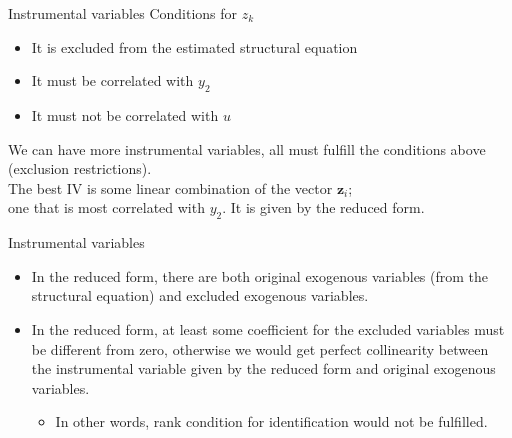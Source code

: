 \documentclass[usenames,dvipsnames]{beamer}
\begin{document}
\begin{frame}{Instrumental variables}
Conditions for $z_k$
\vspace{0.3cm}
\begin{itemize}
\item It is excluded from the estimated structural equation
\item It must be correlated with $y_2$
\item It must not be correlated with $u$
\end{itemize}
\vspace{0.3cm}
We can have more instrumental variables, all must fulfill the conditions above (exclusion restrictions). \\
\vspace{0.3cm}
The best IV is some linear combination of the vector $\bm{z}_i$; \\ one that is most correlated with $y_2$. It is given by the reduced form. \\
\end{frame}
\begin{frame}{Instrumental variables}
\begin{itemize}
\item In the reduced form, there are both original exogenous variables (from the structural equation) and excluded  exogenous variables.
\vspace{0.5cm}
\item In the reduced form, at least some coefficient for the excluded variables must be different from zero, otherwise we would get perfect collinearity between the instrumental variable given by the reduced form and original exogenous variables. 
\begin{itemize}
\item In other words, rank condition for identification would not be fulfilled.
\end{itemize} 
\end{itemize}
\end{frame}
\end{document}
